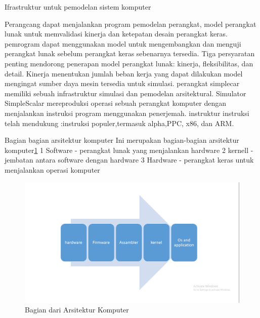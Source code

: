 Ifrastruktur untuk pemodelan sistem komputer

	Perangcang dapat menjalankan program pemodelan perangkat, model perangkat lunak untuk memvalidasi kinerja dan ketepatan desain perangkat keras.
pemrogram dapat menggunakan model  untuk mengembangkan dan menguji perangkat lunak sebelum perangkat keras sebenarnya tersedia.
Tiga persyaratan penting mendorong penerapan model perangkat lunak: kinerja, fleksibilitas, dan detail. 
Kinerja menentukan jumlah beban kerja yang dapat dilakukan model mengingat sumber daya mesin tersedia untuk simulasi.
perangkat simplecar memiliki sebuah infrastruktur simulasi dan pemodelan arsitektural.
Simulator SimpleScalar mereproduksi operasi sebuah  perangkat komputer dengan menjalankan instruksi program menggunakan penerjemah.
instruktur instruksi telah mendukung :instruksi populer,termasuk alpha,PPC, x86, dan ARM.\cite{austin2002simplescalar}

Bagian bagian arsitektur komputer
Ini merupakan bagian-bagian arsitektur komputer\ref{sasasa}
	1 Software - perangkat lunak yang menjalankan hardware
	2 kernell - jembatan antara software dengan hardware
	3 Hardware - perangkat keras untuk menjalankan operasi komputer
\begin{figure}[ht]
\centerline{\includegraphics[width=1\textwidth]{figures/sasasa.PNG}}
\caption{Bagian dari Arsitektur Komputer}
\label{sasasa}
\end{figure}
